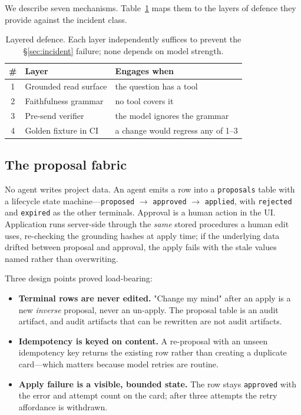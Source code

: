 \documentclass[conference]{IEEEtran}
\begin{document}
We describe seven mechanisms. Table~\ref{tab:layers} maps them to the layers of
defence they provide against the incident class.

\begin{table}[t]
\caption{Layered defence. Each layer independently suffices to prevent the
         \S\ref{sec:incident} failure; none depends on model strength.}
\label{tab:layers}
\centering
\footnotesize
\begin{tabular}{@{}clp{3.5cm}@{}}
\toprule
\textbf{\#} & \textbf{Layer} & \textbf{Engages when} \\
\midrule
1 & Grounded read surface  & the question has a tool \\
2 & Faithfulness grammar   & no tool covers it \\
3 & Pre-send verifier      & the model ignores the grammar \\
4 & Golden fixture in CI   & a change would regress any of 1--3 \\
\bottomrule
\end{tabular}
\end{table}

\subsection{The proposal fabric}
\label{sec:proposals}

No agent writes project data. An agent emits a row into a \texttt{proposals}
table with a lifecycle state machine---\texttt{proposed} $\rightarrow$
\texttt{approved} $\rightarrow$ \texttt{applied}, with \texttt{rejected} and
\texttt{expired} as the other terminals. Approval is a human action in the UI.
Application runs server-side through the \emph{same} stored procedures a human
edit uses, re-checking the grounding hashes at apply time; if the underlying data
drifted between proposal and approval, the apply fails with the stale values
named rather than overwriting.

Three design points proved load-bearing:

\begin{itemize}
  \item \textbf{Terminal rows are never edited.} "Change my mind" after an apply
        is a new \emph{inverse} proposal, never an un-apply. The proposal table
        is an audit artifact, and audit artifacts that can be rewritten are not
        audit artifacts.
  \item \textbf{Idempotency is keyed on content.} A re-proposal with an unseen
        idempotency key returns the existing row rather than creating a duplicate
        card---which matters because model retries are routine.
  \item \textbf{Apply failure is a visible, bounded state.} The row stays
        \texttt{approved} with the error and attempt count on the card; after
        three attempts the retry affordance is withdrawn.
\end{itemize}
\end{document}
